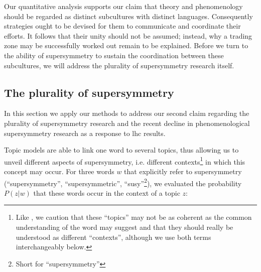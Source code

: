 \documentclass[smallextended]{svjour3}
\begin{document}


Our quantitative analysis supports our claim that theory and phenomenology should be regarded as distinct subcultures with distinct languages. Consequently strategies ought to be devised for them to communicate and coordinate their efforts. It follows that their unity should not be assumed; instead, why a trading zone may be successfully worked out remain to be explained. Before we turn to the ability of supersymmetry to sustain the coordination between these subcultures, we will address the plurality of supersymmetry research itself.

\subsection{The plurality of supersymmetry}
\label{section:application_plurality}

In this section we apply our methods to address our second claim regarding the plurality of supersymmetry research and the recent decline in phenomenological supersymmetry research as a response to  \gls{lhc} results.

Topic models are able to link one word to several topics, thus allowing us to unveil different aspects of supersymmetry, i.e. different contexts\footnote{Like \citet{Allen2022}, we caution that these ``topics'' may not be as coherent as the common understanding of the word may suggest and that they should really be understood as different ``contexts'', although we use both terms interchangeably below.} in which this concept may occur. For three words $w$ that explicitly refer to supersymmetry (``supersymmetry'', ``supersymmetric'', ``susy''\footnote{Short for ``supersymmetry''}), we evaluated the probability $P(z|w)$ that these words occur in the context of a topic $z$:
\end{document}
